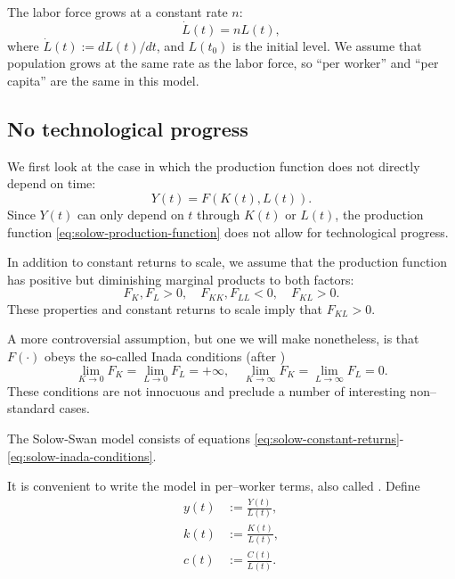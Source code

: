 \documentclass[\topdir/lecture\_notes.tex]{subfiles}
\begin{document}
The labor force grows at a constant rate \(n\):
\begin{equation}
  \dot{L}(t)=n L(t), \label{eq:solow-labor-growth}
\end{equation}
where \(\dot{L}(t) := dL(t) / dt\), and \(L(t_{0})\) is the initial level.
We assume that population grows at the same rate as the labor force, so ``per worker'' and ``per capita'' are the same in this model.

\subsection{No technological progress}
We first look at the case in which the production function does not directly depend on time:
\begin{equation}
  Y(t)=F(K(t), L(t)). \label{eq:solow-production-no-tech}
\end{equation}
Since \(Y(t)\) can only depend on \(t\) through \(K(t)\) or \(L(t)\), the production function \eqref{eq:solow-production-function} does not allow for technological progress.

In addition to constant returns to scale, we assume that the production function has positive but diminishing marginal products to both factors:
\begin{equation}
  F_{K}, F_{L}>0, \quad F_{K K}, F_{L L}<0, \quad F_{K L}>0. \label{eq:solow-marginal-products}
\end{equation}
These properties and constant returns to scale imply that \(F_{K L}>0\).

A more controversial assumption, but one we will make nonetheless, is that \(F(\cdot)\) obeys the so-called Inada conditions (after \parencite{inada1963conditions})
\begin{equation}
  \lim _{K \rightarrow 0} F_{K}=\lim _{L \rightarrow 0} F_{L}=+\infty, \quad \lim _{K \rightarrow \infty} F_{K}=\lim _{L \rightarrow \infty} F_{L}=0. \label{eq:solow-inada-conditions}
\end{equation}
These conditions are not innocuous and preclude a number of interesting non--standard cases.

The Solow-Swan model consists of equations \eqref{eq:solow-constant-returns}-\eqref{eq:solow-inada-conditions}.

It is convenient to write the model in per--worker terms, also called .
Define
\begin{align*}
  y(t) &:= \frac{Y(t)}{L(t)}, \\
  k(t) &:= \frac{K(t)}{L(t)}, \\
  c(t) &:= \frac{C(t)}{L(t)}.
\end{align*}
\end{document}
